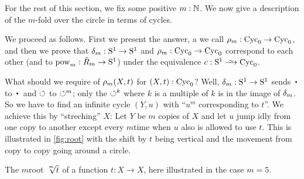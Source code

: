 For the rest of this section, we fix some positive $m:\mathbb{N}$.
We now give a description of
the $m$-fold \covering over the circle in terms of cycles.

We proceed as follows.
First we present the answer, a \covering we call $\rho_{m}:\mathrm{Cyc}_0\to\mathrm{Cyc}_0$,
and then we prove that $\delta_{m}:{\mathrm{S}^1}\to{\mathrm{S}^1}$ and $\rho_{m}:\mathrm{Cyc}_0\to\mathrm{Cyc}_0$
correspond to each other (and to $\pow{m}:\tilde R_m\to\Sc$)
under the equivalence $c:\Sc\we\Cyc_0$.

What should we require of $\rho_{m}(X,t)$ for $(X,t):\mathrm{Cyc}_0$?
Well, $\delta_{m}:{\mathrm{S}^1}\to{\mathrm{S}^1}$ sends $\base$ to $\base$ and $\circlearrowleft$ to $\circlearrowleft^m$;
only the $\circlearrowleft^k$ where $k$ is a multiple of $k$ is in the image of $\delta_{m}$.
So we have to find an infinite cycle $(Y,u)$ with ``$u^m$ corresponding to $t$''.
We achieve this by ``streching'' $X$:
Let $Y$ be $m$ copies of $X$ and let $u$ jump idly from one copy to another except every $m$\th time when $u$ also is allowed to use $t$.
This is illustrated in \cref{fig:root} with the shift by $t$ being
vertical and the movement from copy to copy going around a circle.
\begin{marginfigure}
  \caption{The $m$\th root $\sqrt[\uproot{2}m]t$
    of a function $t: X\to X$,
    here illustrated in the case $m=5$.}\label{fig:root}
\end{marginfigure}

